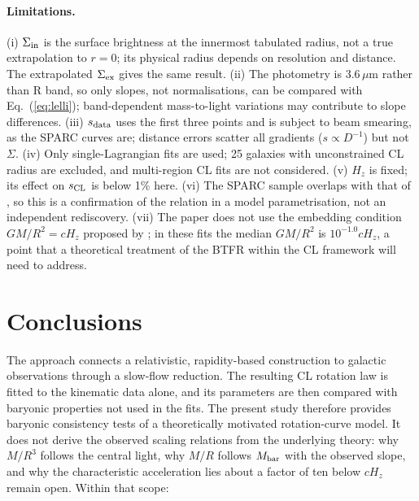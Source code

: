\documentclass[11pt,a4paper]{article}
\newcommand{\sCL}{s_{\rm CL}}
\newcommand{\sdat}{s_{\rm data}}
\newcommand{\Sin}{\Sigma_{\rm in}}
\newcommand{\Mbar}{M_{\rm bar}}
\begin{document}
\paragraph{Limitations.} (i) $\Sin$ is the surface brightness at the innermost tabulated radius, not a true extrapolation to $r=0$; its physical radius depends on resolution and distance. The extrapolated $\Sigma_{\rm ex}$ gives the same result. (ii) The photometry is 3.6\,$\mu$m rather than R band, so only slopes, not normalisations, can be compared with Eq.~(\ref{eq:lelli}); band-dependent mass-to-light variations may contribute to slope differences. (iii) $\sdat$ uses the first three points and is subject to beam smearing, as the SPARC curves are; distance errors scatter all gradients ($s\propto D^{-1}$) but not $\Sigma$. (iv) Only single-Lagrangian fits are used; 25 galaxies with unconstrained CL radius are excluded, and multi-region CL fits \citep{deHaas2026} are not considered. (v) $H_z$ is fixed; its effect on $\sCL$ is below 1\% here. (vi) The SPARC sample overlaps with that of \citet{Lelli2013}, so this is a confirmation of the relation in a model parametrisation, not an independent rediscovery. (vii) The paper does not use the embedding condition $GM/R^2=cH_z$ proposed by \citet{deHaas2025c}; in these fits the median $GM/R^2$ is $10^{-1.0}cH_z$, a point that a theoretical treatment of the BTFR within the CL framework will need to address.

\section{Conclusions}

The approach connects a relativistic, rapidity-based construction to galactic observations through a slow-flow reduction. The resulting CL rotation law is fitted to the kinematic data alone, and its parameters are then compared with baryonic properties not used in the fits. The present study therefore provides baryonic consistency tests of a theoretically motivated rotation-curve model. It does not derive the observed scaling relations from the underlying theory: why $M/R^3$ follows the central light, why $M/R$ follows $\Mbar$ with the observed slope, and why the characteristic acceleration lies about a factor of ten below $cH_z$ remain open. Within that scope:
\end{document}
